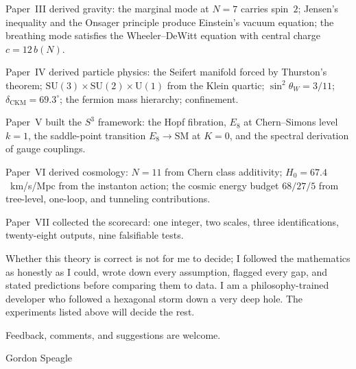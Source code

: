 Paper~III derived gravity: the marginal mode at $N = 7$ carries spin~$2$;
Jensen's inequality and the Onsager principle produce Einstein's vacuum
equation; the breathing mode satisfies the Wheeler--DeWitt equation with
central charge $c = 12\,b(N)$.

Paper~IV derived particle physics: the Seifert manifold forced by
Thurston's theorem; $\mathrm{SU}(3) \times \mathrm{SU}(2) \times
\mathrm{U}(1)$ from the Klein quartic; $\sin^2\theta_W = 3/11$;
$\delta_{\mathrm{CKM}} = 69.3^\circ$; the fermion mass hierarchy;
confinement.

Paper~V built the $S^3$ framework: the Hopf fibration, $E_8$ at
Chern--Simons level $k = 1$, the saddle-point transition
$E_8 \to \mathrm{SM}$ at $K = 0$, and the spectral derivation of
gauge couplings.

Paper~VI derived cosmology: $N = 11$ from Chern class additivity;
$H_0 = 67.4$~km/s/Mpc from the instanton action; the cosmic energy
budget $68/27/5$ from tree-level, one-loop, and tunneling contributions.

Paper~VII collected the scorecard: one integer, two scales, three
identifications, twenty-eight outputs, nine falsifiable tests.

\bigskip

Whether this theory is correct is not for me to decide; I followed the
mathematics as honestly as I could, wrote down every assumption, flagged
every gap, and stated predictions before comparing them to data. I am
a philosophy-trained developer who followed a hexagonal storm down a
very deep hole. The experiments listed above will decide the rest.

Feedback, comments, and suggestions are welcome.

\bigskip

\hfill Gordon Speagle



